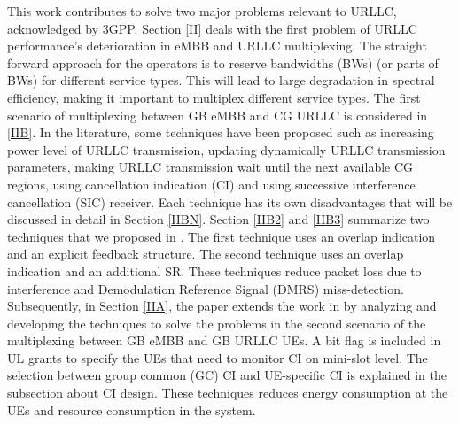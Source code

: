 \documentclass{ieeeaccess}
\begin{document}
This work contributes to solve two major problems relevant to URLLC, acknowledged by 3GPP. Section \ref{II} deals with the first problem of URLLC performance's deterioration in eMBB and URLLC multiplexing. The straight forward approach for the operators is to reserve bandwidths (BWs) (or parts of BWs) for different service types. This will lead to large degradation in spectral efficiency, making it important to multiplex different service types.  The first scenario of multiplexing between GB eMBB and CG URLLC is considered in \ref{IIB}. In the literature, some techniques have been proposed such as increasing power level of URLLC transmission, updating dynamically URLLC transmission parameters, making URLLC transmission wait until the next available CG regions, using cancellation indication (CI) and using successive interference cancellation (SIC) receiver. Each technique has its own disadvantages that will be discussed in detail in Section \ref{IIBN}. Section \ref{IIB2} and \ref{IIB3} summarize two techniques that we proposed in \cite{ad99}. The first technique uses an overlap indication and an explicit feedback structure. The second technique uses an overlap indication and an additional SR. These techniques reduce packet loss due to interference and Demodulation Reference Signal (DMRS) miss-detection. Subsequently, in Section \ref{IIA}, the paper extends the work in \cite{ad99} by analyzing and developing the techniques to solve the problems in the second scenario of the multiplexing between GB eMBB and GB URLLC UEs.  A bit flag is included in UL grants to specify the UEs that need to monitor CI on mini-slot level. The selection between group common (GC) CI and UE-specific CI is explained in the subsection about CI design. These techniques reduces energy consumption at the UEs and resource consumption in the system.
\end{document}
